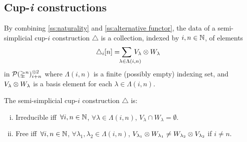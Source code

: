 
%

\subsection{Cup-\textit{i} constructions}

By combining \cref{ss:naturality} and \cref{ss:alternative functor}, the data of a semi-simplicial cup-$i$ construction $\triangle$ is a collection, indexed by $i,n \in \mathbb{N}$, of elements
\[
\triangle_i [n] =
\sum_{\mathclap{\quad \lambda \in \Lambda(i,n)}} \, V_\lambda \ot W_\lambda
\]
in $\mathcal{P}(\mathbb{\Delta}^n)^{\otimes 2}_{i+n}$
where $\Lambda(i,n)$ is a finite (possibly empty) indexing set, and $V_\lambda \otimes W_\lambda$ is a basis element for each $\lambda \in \Lambda(i,n)$.

\begin{lemma}\label{l:properties}
	The semi-simplicial \mbox{cup-$i$} construction $\triangle$ is:
	\begin{enumerate}[(i)]
		\item Irreducible iff\,
		$\forall i,n \in \mathbb{N}$, $\forall \lambda \in \Lambda(i,n)$, $V_\lambda \cap W_\lambda = \emptyset$.
		\item Free iff\,
		$\forall i,n \in \mathbb{N}$, $\forall \lambda_1, \lambda_2 \in \Lambda(i,n)$, $V_{\lambda_1} \otimes W_{\lambda_1} \neq W_{\lambda_2} \otimes V_{\lambda_2}$ if $i \neq n$.
	\end{enumerate}
\end{lemma}

